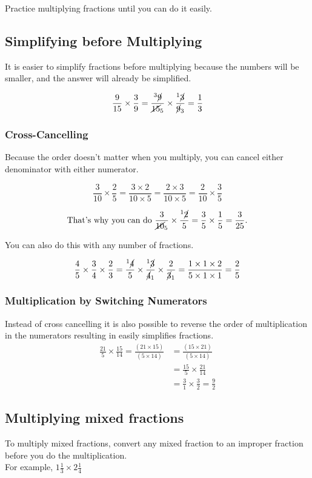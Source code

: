 \documentclass[16pt]{article}
\begin{document}
\begin{spacing}{1.25}
Practice multiplying fractions until you can do it easily.

\subsection*{Simplifying before Multiplying}
It is easier to simplify fractions before multiplying because the numbers will be smaller, and the answer will already be simplified.

$$\frac{9}{15} \times \frac{3}{9} =
\frac{{^3\cancel{9}}}{{\cancel{15}_5}} \times \frac{{^1\cancel{3}}}{{\cancel{9}_3}} = \frac{1}{3}$$

\subsubsection*{Cross-Cancelling}
Because the order doesn't matter when you multiply, you can cancel either denominator with either numerator.

$$\frac{3}{10} \times \frac{2}{5} = \frac{{3 \times 2}}{{10 \times 5}} = \frac{{2 \times 3}}{{10 \times 5}} = \frac{2}{10} \times \frac{3}{5}$$

$$\text{That's why you can do }\frac{3}{{\cancel{10}_5}} \times \frac{{^1\cancel{2}}}{5} = \frac{3}{5} \times \frac{1}{5} = \frac{3}{25}\text{.}$$

You can also do this with any number of fractions.

$$\frac{4}{5} \times \frac{3}{4} \times \frac{2}{3} = \frac{{^1\cancel{4}}}{5} \times \frac{{^1\cancel{3}}}{{\cancel{4}_1}} \times \frac{2}{{\cancel{3}_1}} = \frac{1 \times 1 \times2}{5 \times 1 \times 1} = \frac{2}{5}$$

\subsubsection*{Multiplication by Switching Numerators}
Instead of cross cancelling it is also possible to reverse the order of multiplication in the numerators resulting in easily simplifies fractions.
\begin{align*}
\frac{21}{5} \times \frac{15}{14}
 = \frac{(21 \times 15)}{(5 \times 14)}
&= \frac{(15 \times 21)}{(5 \times 14)}\\
&= \frac{15}{5} \times \frac{21}{14}\\
&= \frac{3}{1} \times \frac{3}{2} = \frac{9}{2}
\end{align*}

\subsection*{Multiplying mixed fractions}
To multiply mixed fractions, convert any mixed fraction to an improper fraction before you do the multiplication.\\
For example, $1 \frac{1}{3} \times 2 \frac{1}{4}$


\end{spacing}
\end{document}
